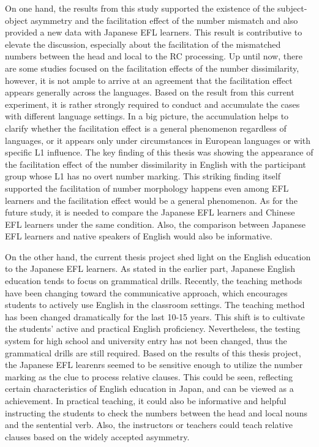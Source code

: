 \documentclass[
]{article}
\begin{document}
On one hand, the results from this study supported the existence of the
subject-object asymmetry and the facilitation effect of the number
mismatch and also provided a new data with Japanese EFL learners. This
result is contributive to elevate the discussion, especially about the
facilitation of the mismatched numbers between the head and local to the
RC processing. Up until now, there are some studies focused on the
facilitation effects of the number dissimilarity, however, it is not
ample to arrive at an agreement that the facilitation effect appears
generally across the languages. Based on the result from this current
experiment, it is rather strongly required to conduct and accumulate the
cases with different language settings. In a big picture, the
accumulation helps to clarify whether the facilitation effect is a
general phenomenon regardless of languages, or it appears only under
circumstances in European languages or with specific L1 influence. The
key finding of this thesis was showing the appearance of the
facilitation effect of the number dissimilarity in English with the
participant group whose L1 has no overt number marking. This striking
finding itself supported the facilitation of number morphology happens
even among EFL learners and the facilitation effect would be a general
phenomenon. As for the future study, it is needed to compare the
Japanese EFL learners and Chinese EFL learners under the same condition.
Also, the comparison between Japanese EFL learners and native speakers
of English would also be informative.

On the other hand, the current thesis project shed light on the English
education to the Japanese EFL learners. As stated in the earlier part,
Japanese English education tends to focus on grammatical drills.
Recently, the teaching methods have been changing toward the
communicative approach, which encourages students to actively use
English in the classroom settings. The teaching method has been changed
dramatically for the last 10-15 years. This shift is to cultivate the
students' active and practical English proficiency. Nevertheless, the
testing system for high school and university entry has not been
changed, thus the grammatical drills are still required. Based on the
results of this thesis project, the Japanese EFL learenrs seemed to be
sensitive enough to utilize the number marking as the clue to process
relative clauses. This could be seen, reflecting certain characteristics
of English education in Japan, and can be viewed as a achievement. In
practical teaching, it could also be informative and helpful instructing
the students to check the numbers between the head and local nouns and
the sentential verb. Also, the instructors or teachers could teach
relative clauses based on the widely accepted asymmetry.
\end{document}
